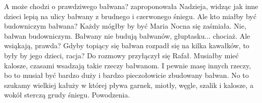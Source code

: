 \begin{dialogue}
	\ds{} A może chodzi o prawdziwego bałwana? \dm{} zaproponowała Nadzieja, widząc jak inne dzieci lepią na ulicy bałwany z brudnego i czerwonego śniegu.
	\ds{} Ale kto miałby być budowniczym bałwana? Każdy mógłby by być \dm{} Maria Nocna się zaśmiała.
	\ds{} Nie, bałwan budowniczym.
	\ds{} Bałwany nie budują bałwanów, głuptasku... chociaż.
	\ds{} Ale wsiąkają, prawda?
	\ds{} Gdyby topiący się bałwan rozpadł się na kilka kawałków, to były by jego dzieci, racja? \dm{} Do rozmowy przyłączył się Rafał.
	\ds{} Musiałby mieć kalosze, czasami wsadzają takie rzeczy bałwanom.
	\ds{} I pewnie masę innych rzeczy, bo to musiał być bardzo duży i bardzo pieczołowicie zbudowany bałwan.
	\ds{} No to szukamy wielkiej kałuży w której pływa garnek, miotły, węgle, szalik i kalosze, a wokół sterczą grudy śniegu. Powodzenia.
\end{dialogue}







